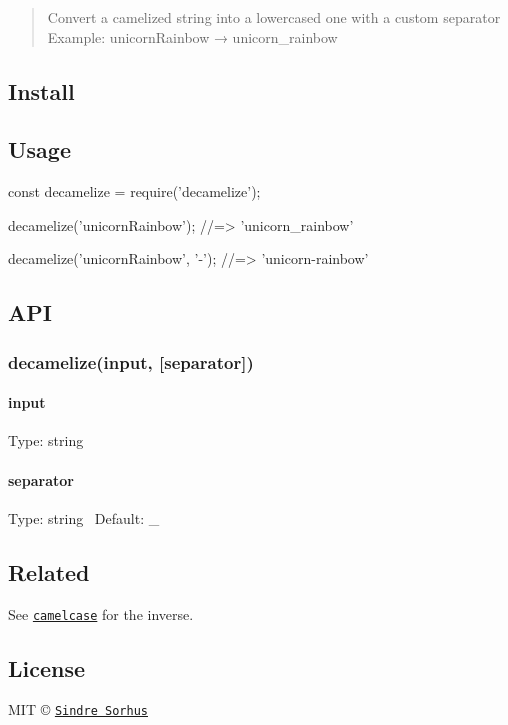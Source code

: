 \begin{quote}
Convert a camelized string into a lowercased one with a custom separator~\newline
 Example\+: {\ttfamily unicorn\+Rainbow} → {\ttfamily unicorn\+\_\+rainbow} \end{quote}


\subsection*{Install}




\subsection*{Usage}


\begin{DoxyCode}
const decamelize = require('decamelize');

decamelize('unicornRainbow');
//=> 'unicorn\_rainbow'

decamelize('unicornRainbow', '-');
//=> 'unicorn-rainbow'
\end{DoxyCode}


\subsection*{A\+PI}

\subsubsection*{decamelize(input, \mbox{[}separator\mbox{]})}

\paragraph*{input}

Type\+: {\ttfamily string}

\paragraph*{separator}

Type\+: {\ttfamily string}~\newline
 Default\+: {\ttfamily \+\_\+}

\subsection*{Related}

See \href{https://github.com/sindresorhus/camelcase}{\tt {\ttfamily camelcase}} for the inverse.

\subsection*{License}

M\+IT © \href{https://sindresorhus.com}{\tt Sindre Sorhus} 